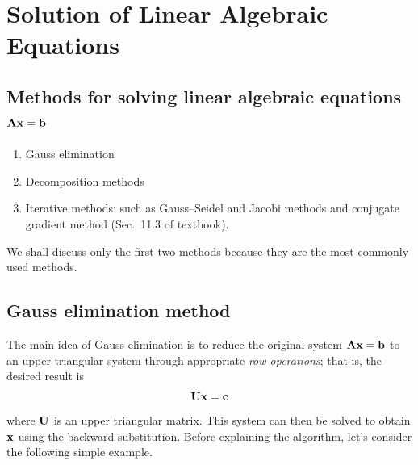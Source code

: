 \chapter{Solution of Linear Algebraic Equations}
\label{ch:solve}

\section{Methods for solving linear algebraic equations \texorpdfstring{$\mathbf{A}\mathbf{x}=\mathbf{b}$}{Ax=b}}
\begin{enumerate}
  \item Gauss elimination
  \item Decomposition methods
  \item Iterative methods: such as Gauss--Seidel and Jacobi methods and conjugate gradient method (Sec.~11.3 of textbook).
\end{enumerate}
We shall discuss only the first two methods because they are the most commonly used methods.

\section{Gauss elimination method}
The main idea of Gauss elimination is to reduce the original system $\mathbf{A}\mathbf{x} = \mathbf{b}$ to an upper triangular system through appropriate \emph{row operations}; that is, the desired result is
\begin{equation*}
  \mathbf{U}\mathbf{x} = \mathbf{c}
\end{equation*}
where $\mathbf{U}$ is an upper triangular matrix. This system can then be solved to obtain $\mathbf{x}$ using the backward substitution. Before explaining the algorithm, let's consider the following simple example.

